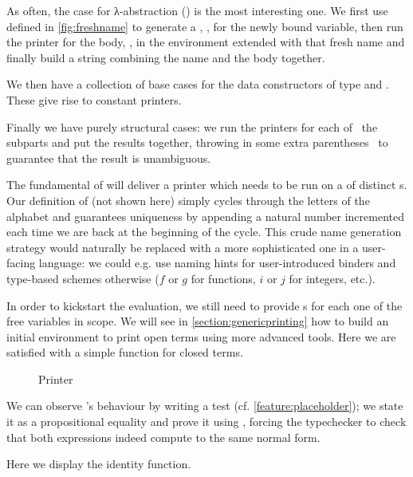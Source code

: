 As often, the case for λ-abstraction () is the most interesting one.
We first use  defined in \cref{fig:freshname} to generate a ,
, for the newly bound variable, then run the printer for the body, ,
in the environment extended with that fresh name and finally build a string
combining the name and the body together.


We then have a collection of base cases for the data constructors of type
 and . These give rise to constant printers.


Finally we have purely structural cases: we run the printers for each of~
the subparts and put the results together, throwing in some extra parentheses~
to guarantee that the result is unambiguous.



The fundamental  of  will deliver a printer which needs to be run
on a  of distinct s. Our definition of  (not
shown here) simply cycles through the letters of the alphabet and guarantees
uniqueness by appending a natural number incremented each time we are back at
the beginning of the cycle. This crude name generation strategy would naturally
be replaced with a more sophisticated one in a user-facing language: we could
e.g. use naming hints for user-introduced binders and type-based schemes otherwise
($f$ or $g$ for functions, $i$ or $j$ for integers, etc.).

In order to kickstart the evaluation, we still need to provide s for each
one of the free variables in scope. We will see in \cref{section:genericprinting}
how to build an initial environment to print open terms using more advanced tools.
Here we are satisfied with a simple  function for closed terms.

\begin{figure}[h]
\caption{Printer\label{fig:printer}}
\end{figure}

We can observe 's behaviour by writing a test
(cf. \cref{feature:placeholder}); we state it as a
propositional equality and prove it using , forcing the typechecker
to check that both expressions indeed compute to the same normal form.

\begin{example}
\label{fig:printtest}
Here we display the identity function.

\end{example}
